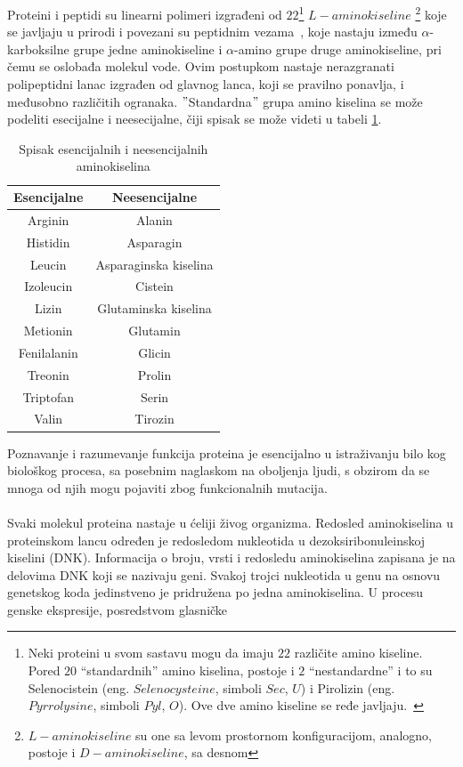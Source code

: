 Proteini i peptidi su linearni polimeri izgrađeni od $22$\footnote{Neki proteini u svom sastavu mogu da imaju $22$ različite amino kiseline. Pored $20$ “standardnih” amino kiselina,
postoje i $2$ “nestandardne” i to su Selenocistein (eng. $Selenocysteine$, simboli $Sec$, $U$) i Pirolizin (eng. $Pyrrolysine$,
simboli $Pyl$, $O$). Ove dve amino kiseline se ređe javljaju.~\cite{MarijaJ}} $L-aminokiseline$ \footnote{$L-aminokiseline$ su one sa levom prostornom konfiguracijom, analogno, postoje i $D-aminokiseline$, sa desnom} koje se javljaju u prirodi i povezani su peptidnim vezama~\cite{biopathways}, koje nastaju između $\alpha$-karboksilne grupe jedne aminokiseline i $\alpha$-amino grupe druge aminokiseline, pri čemu se oslobađa molekul vode. Ovim postupkom nastaje nerazgranati polipeptidni lanac izgrađen od glavnog lanca, koji se pravilno ponavlja, i međusobno različitih ogranaka. $"$Standardna$"$ grupa amino kiselina se može podeliti esecijalne i
neesecijalne, čiji spisak se može videti u tabeli \ref{table:1}. 
\begin{table}[h!]
\centering
	\begin{tabular}{||c c||} 
	\hline 
	Esencijalne & Neesencijalne \\ [0.5ex] 
	\hline\hline
	Arginin & Alanin \\ 
	\hline
	Histidin & Asparagin \\
	\hline
	Leucin & Asparaginska kiselina\\
	\hline
	Izoleucin & Cistein \\
	\hline
	Lizin & Glutaminska kiselina \\ [1ex] 
	\hline
	Metionin & Glutamin \\ [1ex] 
	\hline
	Fenilalanin & Glicin \\ [1ex] 
	\hline
	Treonin & Prolin \\ [1ex] 
	\hline
	Triptofan & Serin \\ [1ex] 
	\hline
	Valin & Tirozin \\ [1ex] 
	\hline
	\end{tabular}
\caption{Spisak esencijalnih i neesencijalnih aminokiselina}
\label{table:1}
\end{table}
Poznavanje i razumevanje funkcija proteina je esencijalno u istraživanju bilo kog biološkog procesa, sa posebnim naglaskom na oboljenja ljudi, s obzirom da
se mnoga od njih mogu pojaviti zbog funkcionalnih mutacija.~\cite{JKd}\\\\
Svaki molekul proteina nastaje u ćeliji živog organizma. Redosled aminokiselina u proteinskom lancu određen je redosledom nukleotida u dezoksiribonuleinskoj kiselini (DNK). Informacija o broju, vrsti i redosledu aminokiselina zapisana je na delovima DNK koji se nazivaju geni. Svakoj trojci nukleotida u genu na osnovu genetskog koda jedinstveno je pridružena po jedna aminokiselina. U procesu genske ekspresije, posredstvom glasničke
